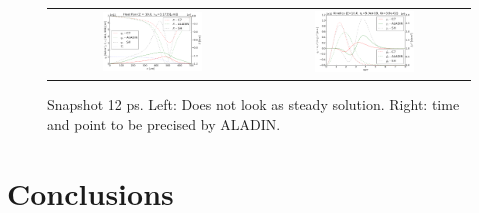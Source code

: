 \documentclass[preprint,12pt]{elsarticle}
\newcommand{\figscale}{0.5}
\begin{document}
\begin{figure}[tbh]
  \begin{center}
    \begin{tabular}{cc}
      \includegraphics[width=\figscale\textwidth]{../VFPdata/C7_Aladin_case4_heatflux.png} & 
      \includegraphics[width=\figscale\textwidth]{../VFPdata/C7_Aladin_case4_kinetics.png}
    \end{tabular}
  \caption{  
  Snapshot 12 ps. Left: Does not look as steady solution. Right: time and point to be precised by ALADIN.
  }
  \end{center}
  \label{fig:C7_ALADIN_case4}
\end{figure}

\clearpage

\section{Conclusions}
\label{sec:Conclusions}


%
\end{document}
